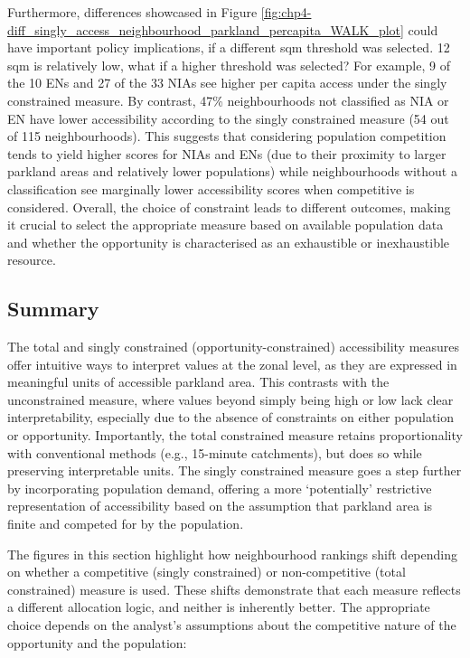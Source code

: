 \documentclass[
11pt, %
oneside, %
english, %
singlespacing, %
]{macthesis} %
\begin{document}
Furthermore, differences showcased in Figure \ref{fig:chp4-diff_singly_access_neighbourhood_parkland_percapita_WALK_plot} could have important policy implications, if a different sqm threshold was selected. 12 sqm is relatively low, what if a higher threshold was selected? For example, 9 of the 10 ENs and 27 of the 33 NIAs see higher per capita access under the singly constrained measure. By contrast, 47\% neighbourhoods not classified as NIA or EN have lower accessibility according to the singly constrained measure (54 out of 115 neighbourhoods). This suggests that considering population competition tends to yield higher scores for NIAs and ENs (due to their proximity to larger parkland areas and relatively lower populations) while neighbourhoods without a classification see marginally lower accessibility scores when competitive is considered. Overall, the choice of constraint leads to different outcomes, making it crucial to select the appropriate measure based on available population data and whether the opportunity is characterised as an exhaustible or inexhaustible resource.

\subsection{Summary}\label{summary}

The total and singly constrained (opportunity-constrained) accessibility measures offer intuitive ways to interpret values at the zonal level, as they are expressed in meaningful units of accessible parkland area. This contrasts with the unconstrained measure, where values beyond simply being high or low lack clear interpretability, especially due to the absence of constraints on either population or opportunity. Importantly, the total constrained measure retains proportionality with conventional methods (e.g., 15-minute catchments), but does so while preserving interpretable units. The singly constrained measure goes a step further by incorporating population demand, offering a more `potentially' restrictive representation of accessibility based on the assumption that parkland area is finite and competed for by the population.

The figures in this section highlight how neighbourhood rankings shift depending on whether a competitive (singly constrained) or non-competitive (total constrained) measure is used. These shifts demonstrate that each measure reflects a different allocation logic, and neither is inherently better. The appropriate choice depends on the analyst's assumptions about the competitive nature of the opportunity and the population:
\end{document}
